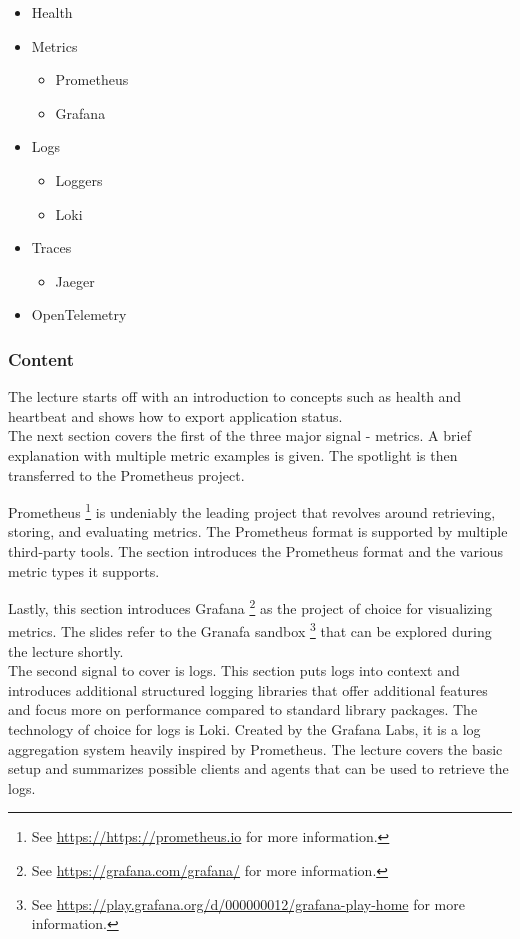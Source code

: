 \documentclass[
  digital,
  color,
  oneside,
  nosansbold,
  nocolorbold,
  lof,
  lot,
]{fithesis4}
\begin{document}
\begin{itemize}
    \item Health
    \item Metrics
    \begin{itemize}
        \item Prometheus
        \item Grafana
    \end{itemize}
    \item Logs
    \begin{itemize}
        \item Loggers
        \item Loki
    \end{itemize}
    \item Traces
    \begin{itemize}
        \item Jaeger
    \end{itemize}
    \item OpenTelemetry
\end{itemize}

\subsubsection{Content}

The lecture starts off with an introduction to concepts such as health and heartbeat and shows how to export application status. \\

The next section covers the first of the three major signal - metrics. A brief explanation with multiple metric examples is given. The spotlight is then transferred to the Prometheus project.

Prometheus 
\footnote{See \url{https://https://prometheus.io} for more information.}
is undeniably the leading project that revolves around retrieving, storing, and evaluating metrics. The Prometheus format is supported by multiple third-party tools. The section introduces the Prometheus format and the various metric types it supports.

Lastly, this section introduces Grafana 
\footnote{See \url{https://grafana.com/grafana/} for more information.}
as the project of choice for visualizing metrics. The slides refer to the Granafa sandbox
\footnote{See \url{https://play.grafana.org/d/000000012/grafana-play-home} for more information.}
that can be explored during the lecture shortly. \\

The second signal to cover is logs. This section puts logs into context and introduces additional structured logging libraries that offer additional features and focus more on performance compared to standard library packages.
The technology of choice for logs is Loki. Created by the Grafana Labs, it is a log aggregation system heavily inspired by Prometheus. The lecture covers the basic setup and summarizes possible clients and agents that can be used to retrieve the logs. \\
\end{document}
